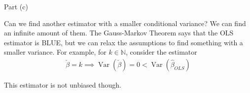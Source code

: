 \begin{frame}{Part (c)}

    Can we find another estimator with a smaller conditional variance? We can find an infinite amount of them. The Gauss-Markov Theorem says that the OLS estimator is BLUE, but we can relax the assumptions to find something with a smaller variance. For example, for $k \in \mathbb{N}$, consider the estimator
    \begin{align*}
        \check{\beta} = k \implies \operatorname{Var}(\check{\beta}) = 0 <  \operatorname{Var}(\hat{\beta}_{OLS})
    \end{align*}

    This estimator is not unbiased though.
    
\end{frame}